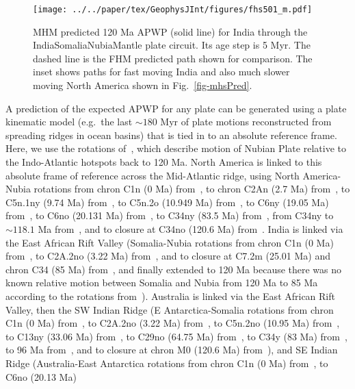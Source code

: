 \begin{figure}[!ht]
  \centering
  \texttt{[image: ../../paper/tex/GeophysJInt/figures/fhs501\_m.pdf]}
  \caption[120 Ma MHM vs FHM predicted APWP of India]{MHM predicted
    120 Ma APWP (solid line) for India through the
    India\textendash{}Somalia\textendash{}Nubia\textendash{}Mantle plate circuit.
    Its age step is 5 Myr. The dashed line is the FHM predicted path shown for
    comparison. The inset shows paths for fast moving India and also much slower
    moving North America shown in Fig.~\ref{fig-mhsPred}.}\label{fig-mhsPred501}
\end{figure}

A prediction of the expected APWP for any plate can be generated using a plate
kinematic model (e.g.\ the last ${\sim}180$ Myr of plate motions
reconstructed from spreading ridges in ocean basins) that is tied in to an
absolute reference frame. Here, we use the rotations of~\citet{O05}, which
describe motion of Nubian Plate relative to the Indo-Atlantic hotspots back to
120 Ma. North America is linked to this absolute frame of reference across the
Mid-Atlantic ridge, using North America-Nubia rotations from chron C1n
(0 Ma) from~\citet{D10}, to chron C2An (2.7 Ma)
from~\citet{Sh12}, to C5n.1ny (9.74 Ma) from~\citet{M99}, to C5n.2o (10.949 Ma)
from~\citet{G13}, to C6ny (19.05 Ma) from~\citet{M99}, to C6no (20.131 Ma)
from~\citet{G13}, to C34ny (83.5 Ma) from~\citet{M99}, from C34ny to
${\sim}118.1$ Ma from~\citet{S12}, and to closure at C34no (120.6 Ma)
from~\citet{G13}. India is linked via the East African Rift Valley
(Somalia-Nubia rotations from chron C1n (0 Ma) from~\citet{D17},
to C2A.2no (3.22 Ma) from~\citet{H05}, and to closure at C7.2m (25.01 Ma) and
chron C34 (85 Ma) from~\citet{R16}, and finally extended to 120 Ma because there
was no known relative motion between Somalia and Nubia from 120 Ma to 85 Ma
according to the rotations from~\citet{M16}). Australia is linked via the East
African Rift Valley, then the SW Indian Ridge (E Antarctica-Somalia rotations
from chron C1n (0 Ma) from~\citet{D17}, to C2A.2no (3.22 Ma)
from~\citet{H05}, to C5n.2no (10.95 Ma) from~\citet{L02}, to C13ny (33.06 Ma)
from~\citet{P08}, to C29no (64.75 Ma) from~\citet{C10}, to C34y (83 Ma)
from~\citet{R16}, to 96 Ma from~\citet{M01}, and to closure at chron M0 (120.6
Ma) from~\citet{M08}), and SE Indian Ridge (Australia-East Antarctica rotations
from chron C1n (0 Ma) from~\citet{D17}, to C6no (20.13 Ma)
